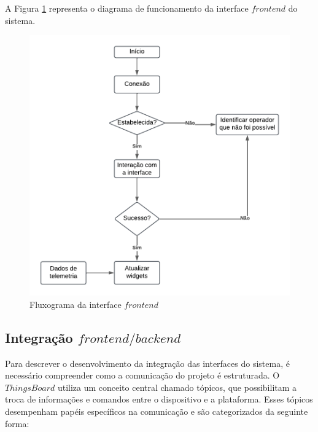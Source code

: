 \documentclass{ecatfg}
\begin{document}
A Figura \ref{fig:5} representa o diagrama de funcionamento  da interface $frontend$ do sistema. \par  

\begin{figure}[!htb]
    \centering
    \includegraphics[scale=0.17]{Figuras/fluxograma_frontend.png}
    \caption{Fluxograma da interface $frontend$}
    \label{fig:5}
\end{figure}

\subsection{Integração $frontend/backend$}
\label{SeçãoIV4}
Para descrever o desenvolvimento da integração das interfaces do sistema, é necessário compreender como a comunicação do projeto é estruturada. O $ThingsBoard$ utiliza um conceito central chamado tópicos, que possibilitam a troca de informações e comandos entre o dispositivo e a plataforma. Esses tópicos desempenham papéis específicos na comunicação e são categorizados da seguinte forma: \par 
\end{document}
